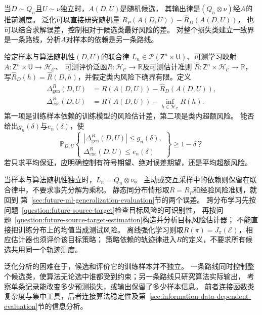 当$D\sim Q_n$且$U\sim\nu$独立时，$A(D,U)$是随机候选，
其输出律是$(Q_n\otimes\nu)$经$A$的推前测度。
泛化可以直接研究随机量
$R_P(A(D,U))-\widehat R_D(A(D,U))$，
也可以结合求解误差，控制相对于候选类最好风险的差。
对整个损失类建立一致界是一条路线，分析$A$对样本的依赖是另一条路线。

\begin{mathproblem}[给定学习规则的泛化与超额风险]
  \label{question:future-learned-risk}
  给定样本与算法随机性$(D,U)$的联合律
  $L_n\in\mathcal P(\mathsf Z^n\times\mathsf U)$、可测学习映射
  $A:\mathsf Z^n\times\mathsf U\to\mathcal H_{\mathcal C}$、
  可测评价泛函$R:\mathcal H_{\mathcal C}\to\mathbb R$及可测估计准则
  $\widehat R:\mathsf Z^n\times\mathcal H_{\mathcal C}\to\mathbb R$，
  写$\widehat R_D(h)=\widehat R(D,h)$，并假定类内风险下确界有限。定义
  \[
    \begin{aligned}
      \Delta_{\mathrm{gen}}^R(D,U)
        &=R(A(D,U))-\widehat R_D(A(D,U)),\\
      \Delta_{\mathrm{exc}}^R(D,U)
        &=R(A(D,U))-\inf_{h\in\mathcal H_{\mathcal C}}R(h).
    \end{aligned}
  \]
  第一项是训练样本依赖的训练模型的风险估计差，第二项是类内超额风险。
  能否给出$g_n(\delta)$与$e_n(\delta)$，使
  \[
    \mathbb P_{D,U}\!\left\{
      \begin{gathered}
        |\Delta_{\mathrm{gen}}^R(D,U)|\leq g_n(\delta),\\
        \Delta_{\mathrm{exc}}^R(D,U)\leq e_n(\delta)
      \end{gathered}
    \right\}\geq1-\delta\text{？}
  \]
  若只求平均保证，应明确控制有符号期望、绝对误差期望，还是平均超额风险。
\end{mathproblem}

当样本与算法随机性独立时，$L_n=Q_n\otimes\nu$。
主动或交互采样中的依赖则保留在联合律中，不要求事先分解为乘积。
静态同分布情形取$R=R_P$和经验风险准则，就回到
第~\ref{sec:future-ml-generalization-evaluation}节的两个误差。
跨分布学习先按问题~\ref{question:future-source-target}检查目标风险的可识别性，
再按问题~\ref{question:future-source-target-estimation}构造并分析目标风险估计器；
不能直接把训练分布上的均值当成测试风险。
离线强化学习则取$R(\pi)=J_\pi(\mathcal E)$，相应估计器也须评价该目标策略；
策略依赖的轨迹律进入$R$的定义，不要求所有候选共用同一个轨迹测度。

泛化分析的困难在于，候选和评价它的训练样本并不独立。
一条路线同时控制整个候选类，使算法无论选中谁都受到约束；另一条路线只研究算法实际输出，
考察单条记录能改变多少预测损失，或输出保留了多少样本信息。
前者连接函数类复杂度与集中工具，后者连接算法稳定性及第~\ref{sec:information-data-dependent-evaluation}节的信息分析。

